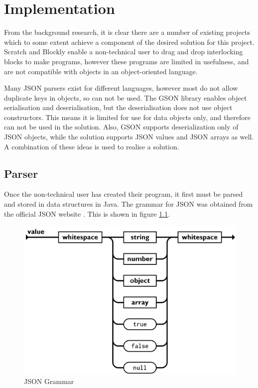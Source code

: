 \chapter{Implementation}

From the background research, it is clear there are a number of existing projects which to some extent achieve a component of the desired solution for this project. Scratch and Blockly enable a non-technical user to drag and drop interlocking blocks to make programs, however these programs are limited in usefulness, and are not compatible with objects in an object-oriented language.\par
Many JSON parsers exist for different languages, however most do not allow duplicate keys in objects, so can not be used. The GSON library enables object serialisation and deserialisation, but the deserialisation does not use object constructors. This means it is limited for use for data objects only, and therefore can not be used in the solution. Also, GSON supports deserialization only of JSON objects, while the solution supports JSON values and JSON arrays as well. A combination of these ideas is used to realise a solution.

\section{Parser}

Once the non-technical user has created their program, it first must be parsed and stored in data structures in Java. The grammar for JSON was obtained from the official JSON website \cite{json}. This is shown in figure \ref{fig:json_grammar}.
\begin{figure}
    \centering
    \includegraphics[width=1.0\textwidth]{Figures/json-grammar.png}
    \caption{JSON Grammar}
    \label{fig:json_grammar}
\end{figure}

